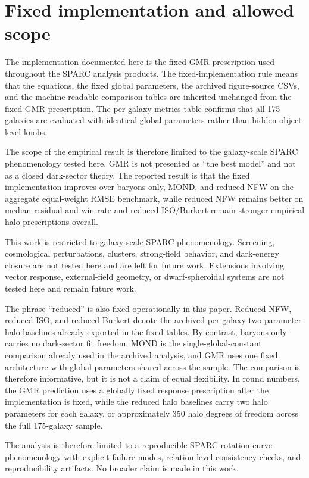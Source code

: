 ﻿\documentclass[twocolumn]{aastex701}
\begin{document}
\section{Fixed implementation and allowed scope}

The implementation documented here is the fixed GMR prescription used throughout the SPARC analysis products. The fixed-implementation rule means that the equations, the fixed global parameters, the archived figure-source CSVs, and the machine-readable comparison tables are inherited unchanged from the fixed GMR prescription. The per-galaxy metrics table confirms that all 175 galaxies are evaluated with identical global parameters rather than hidden object-level knobs.

The scope of the empirical result is therefore limited to the galaxy-scale SPARC phenomenology tested here. GMR is not presented as ``the best model'' and not as a closed dark-sector theory. The reported result is that the fixed implementation improves over baryons-only, MOND, and reduced NFW on the aggregate equal-weight RMSE benchmark, while reduced NFW remains better on median residual and win rate and reduced ISO/Burkert remain stronger empirical halo prescriptions overall.

This work is restricted to galaxy-scale SPARC phenomenology. Screening, cosmological perturbations, clusters, strong-field behavior, and dark-energy closure are not tested here and are left for future work. Extensions involving vector response, external-field geometry, or dwarf-spheroidal systems are not tested here and remain future work.

The phrase ``reduced'' is also fixed operationally in this paper. Reduced NFW, reduced ISO, and reduced Burkert denote the archived per-galaxy two-parameter halo baselines already exported in the fixed tables. By contrast, baryons-only carries no dark-sector fit freedom, MOND is the single-global-constant comparison already used in the archived analysis, and GMR uses one fixed architecture with global parameters shared across the sample. The comparison is therefore informative, but it is not a claim of equal flexibility. In round numbers, the GMR prediction uses a globally fixed response prescription after the implementation is fixed, while the reduced halo baselines carry two halo parameters for each galaxy, or approximately 350 halo degrees of freedom across the full 175-galaxy sample.

The analysis is therefore limited to a reproducible SPARC rotation-curve phenomenology with explicit failure modes, relation-level consistency checks, and reproducibility artifacts. No broader claim is made in this work.
\end{document}
